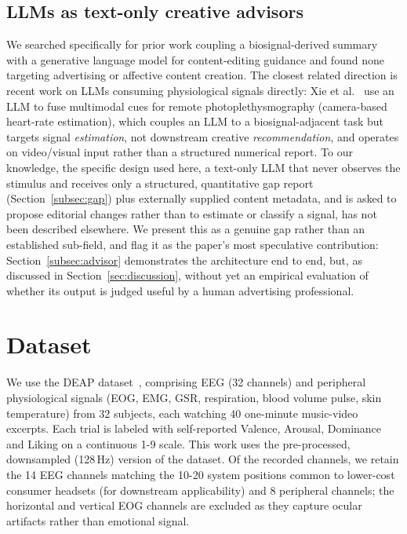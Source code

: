 \documentclass[conference]{IEEEtran}
\begin{document}
\subsection{LLMs as text-only creative advisors}
We searched specifically for prior work coupling a biosignal-derived
summary with a generative language model for content-editing guidance
and found none targeting advertising or affective content creation. The
closest related direction is recent work on LLMs consuming physiological
signals directly: Xie et al.~\cite{xie2025physllm} use an LLM to fuse
multimodal cues for remote photoplethysmography (camera-based heart-rate
estimation), which couples an LLM to a biosignal-adjacent task but
targets signal \emph{estimation}, not downstream creative
\emph{recommendation}, and operates on video/visual input rather than a
structured numerical report. To our knowledge, the specific design used
here, a text-only LLM that never observes the stimulus and receives only
a structured, quantitative gap report (Section~\ref{subsec:gap}) plus
externally supplied content metadata, and is asked to propose editorial
changes rather than to estimate or classify a signal, has not been
described elsewhere. We present this as a genuine gap rather than an
established sub-field, and flag it as the paper's most speculative
contribution: Section~\ref{subsec:advisor} demonstrates the architecture
end to end, but, as discussed in Section~\ref{sec:discussion}, without
yet an empirical evaluation of whether its output is judged useful by a
human advertising professional.

\section{Dataset}
\label{sec:data}

We use the DEAP dataset~\cite{koelstra2012deap}, comprising EEG (32
channels) and peripheral physiological signals (EOG, EMG, GSR,
respiration, blood volume pulse, skin temperature) from 32 subjects, each
watching 40 one-minute music-video excerpts. Each trial is labeled with
self-reported Valence, Arousal, Dominance and Liking on a continuous 1-9
scale. This work uses the pre-processed, downsampled (128\,Hz) version of
the dataset. Of the recorded channels, we retain the 14 EEG channels
matching the 10-20 system positions common to lower-cost consumer
headsets (for downstream applicability) and 8 peripheral channels; the
horizontal and vertical EOG channels are excluded as they capture ocular
artifacts rather than emotional signal.
\end{document}
